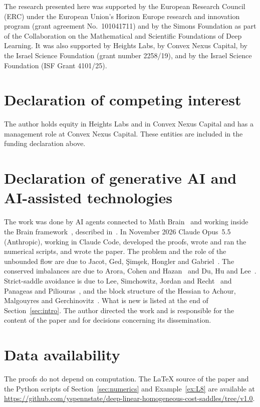 \documentclass[11pt]{amsart}
\theoremstyle{definition}
\theoremstyle{remark}
\numberwithin{equation}{section}
\begin{document}
The research presented here was supported by the European Research Council (ERC) under the European Union's Horizon Europe research and innovation program (grant agreement No.~101041711) and by the Simons Foundation as part of the Collaboration on the Mathematical and Scientific Foundations of Deep Learning. It was also supported by Heights Labs, by Convex Nexus Capital, by the Israel Science Foundation (grant number 2258/19), and by the Israel Science Foundation (ISF Grant 4101/25).

\section*{Declaration of competing interest}
The author holds equity in Heights Labs and in Convex Nexus Capital and has a management role at Convex Nexus Capital. These entities are included in the funding declaration above.

\section*{Declaration of generative AI and AI-assisted technologies}
The work was done by AI agents connected to Math Brain~\cite{MathBrainRepo} and working inside the Brain framework~\cite{BrainFramework}, described in~\cite{MathBrainPaper}. In November 2026 Claude Opus~5.5 (Anthropic), working in Claude Code, developed the proofs, wrote and ran the numerical scripts, and wrote the paper. The problem and the role of the unbounded flow are due to Jacot, Ged, \c{S}im\c{s}ek, Hongler and Gabriel~\cite{JGSHG}. The conserved imbalances are due to Arora, Cohen and Hazan~\cite{ACH} and Du, Hu and Lee~\cite{DHL}. Strict-saddle avoidance is due to Lee, Simchowitz, Jordan and Recht~\cite{LSJR} and Panageas and Piliouras~\cite{PP}, and the block structure of the Hessian to Achour, Malgouyres and Gerchinovitz~\cite{AMG}. What is new is listed at the end of Section~\ref{sec:intro}. The author directed the work and is responsible for the content of the paper and for decisions concerning its dissemination.

\section*{Data availability}
The proofs do not depend on computation. The \LaTeX{} source of the paper and the Python scripts of Section~\ref{sec:numerics} and Example~\ref{ex:L8} are available at \url{https://github.com/yspennstate/deep-linear-homogeneous-cost-saddles/tree/v1.0}.
\end{document}
